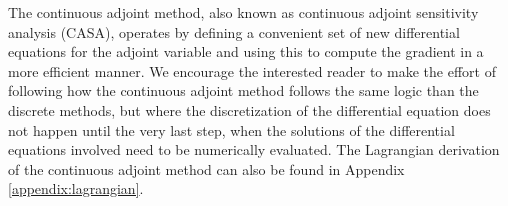 The continuous adjoint method, also known as continuous adjoint sensitivity analysis (CASA), operates by defining a convenient set of new differential equations for the adjoint variable and using this to compute the gradient in a more efficient manner. 
We encourage the interested reader to make the effort of following how the continuous adjoint method follows the same logic than the discrete methods, but where the discretization of the differential equation does not happen until the very last step, when the solutions of the differential equations involved need to be numerically evaluated. 
The Lagrangian derivation of the continuous adjoint method can also be found in Appendix \ref{appendix:lagrangian}.

